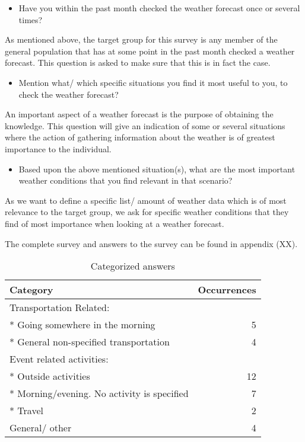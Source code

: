 \begin{itemize}
\item Have you within the past month checked the weather forecast once or several times?
\end{itemize}
As mentioned above, the target group for this survey is any member of the general population that has at some point in the past month checked a weather forecast.
This question is asked to make sure that this is in fact the case.

\begin{itemize}
\item Mention what/ which specific situations you find it most useful to you, to check the weather forecast?
\end{itemize}

An important aspect of a weather forecast is the purpose of obtaining the knowledge. 
This question will give an indication of some or several situations where the action of gathering information about the weather is of greatest importance to the individual.

\begin{itemize}
\item Based upon the above mentioned situation(s), what are the most important weather conditions that you find relevant in that scenario?
\end{itemize}

As we want to define a specific list/ amount of weather data which is of most relevance to the target group, we ask for specific weather conditions that they find of most importance when looking at a weather forecast.


The complete survey and answers to the survey can be found in appendix (XX).
\bigskip

\begin{table}[!htbp]
    \centering
    \begin{tabular}{ l | r }
        \textbf{Category} & \textbf{Occurrences}\\
        \hline
        Transportation Related: & \\
        * Going somewhere in the morning & 5 \\
        * General non-specified transportation & 4 \\
        Event related activities: & \\
        * Outside activities & 12 \\
        * Morning/evening. No activity is specified & 7 \\
        * Travel & 2 \\
        General/ other & 4 \\
    \end{tabular}
    \caption{Categorized answers} \label{tab:categorizedAnswers}
\end{table}

